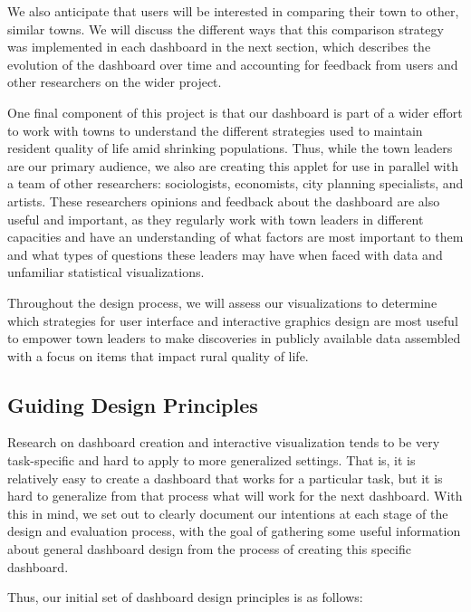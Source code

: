 \documentclass[letterpaper,inpress]{jdsart}
\begin{document}
We also anticipate that users will be interested in comparing their town to other, similar towns. We will discuss the different ways that this comparison strategy was implemented in each dashboard in the next section, which describes the evolution of the dashboard over time and accounting for feedback from users and other researchers on the wider project.

One final component of this project is that our dashboard is part of a wider effort to work with towns to understand the different strategies used to maintain resident quality of life amid shrinking populations. Thus, while the town leaders are our primary audience, we also are creating this applet for use in parallel with a team of other researchers: sociologists, economists, city planning specialists, and artists. These researchers opinions and feedback about the dashboard are also useful and important, as they regularly work with town leaders in different capacities and have an understanding of what factors are most important to them and what types of questions these leaders may have when faced with data and unfamiliar statistical visualizations.

Throughout the design process, we will assess our visualizations to determine which strategies for user interface and interactive graphics design are most useful to empower town leaders to make discoveries in publicly available data assembled with a focus on items that impact rural quality of life.

\hypertarget{guiding-design-principles}{%
\subsection{Guiding Design Principles}\label{guiding-design-principles}}

Research on dashboard creation and interactive visualization tends to be very task-specific and hard to apply to more generalized settings. That is, it is relatively easy to create a dashboard that works for a particular task, but it is hard to generalize from that process what will work for the next dashboard. With this in mind, we set out to clearly document our intentions at each stage of the design and evaluation process, with the goal of gathering some useful information about general dashboard design from the process of creating this specific dashboard.

Thus, our initial set of dashboard design principles is as follows:
\end{document}
